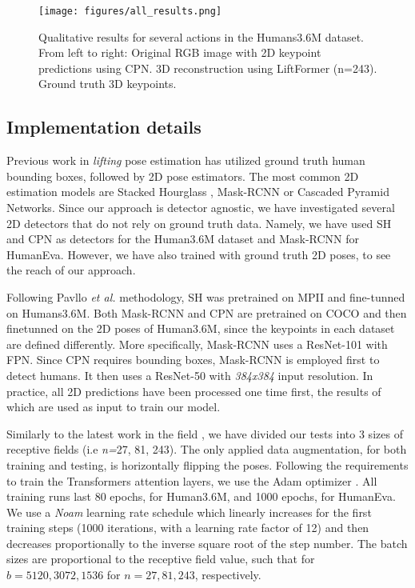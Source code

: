 \documentclass[letterpaper]{article}
\begin{document}
\begin{figure*}[bp]
    \centering
    \texttt{[image: figures/all\_results.png]}
    \caption{Qualitative results for several actions in the Humans3.6M dataset. From left to right: Original RGB image with 2D keypoint predictions using CPN. 3D reconstruction using LiftFormer (n=243). Ground truth 3D keypoints.}
    \label{fig:qualitative_results}
\end{figure*}

\subsection{Implementation details}
Previous work in \textit{lifting} pose estimation has utilized ground truth human bounding boxes, followed by 2D pose estimators. The most common 2D estimation models are Stacked Hourglass \cite{newell16}, Mask-RCNN \cite{he17} or Cascaded Pyramid Networks\cite{chen18}. Since our approach is detector agnostic, we have investigated several 2D detectors that do not rely on ground truth data. Namely, we have used SH and CPN as detectors for the Human3.6M dataset and Mask-RCNN for HumanEva. However, we have also trained with ground truth 2D poses, to see the reach of our approach.

Following Pavllo \textit{et al.} \cite{pavllo19} methodology, SH  was pretrained on MPII and fine-tunned on Humans3.6M. Both Mask-RCNN and CPN are pretrained on COCO \cite{lin14} and then finetunned on the 2D poses of Human3.6M, since the keypoints in each dataset are defined differently. More specifically, Mask-RCNN uses a ResNet-101 with FPN. Since CPN requires bounding boxes, Mask-RCNN is employed first to detect humans. It then uses a ResNet-50 with \textit{384x384} input resolution. In practice, all 2D predictions have been processed one time first, the results of which are used as input to train our model.

Similarly to the latest work in the field \cite{pavllo19, liu20}, we have divided our tests into 3 sizes of receptive fields (i.e \textit{n=}27, 81, 243).  The only applied data augmentation, for both training and testing, is horizontally flipping the poses. Following the requirements to train the Transformers attention layers, we use the Adam optimizer \cite{reddi18}. All training runs last 80 epochs, for Human3.6M, and 1000 epochs, for HumanEva. We use a \textit{Noam} learning rate schedule which linearly increases for the first training steps \cite{goyal17} (1000 iterations, with a learning rate factor of 12) and then decreases proportionally to the inverse square root of the step number. The batch sizes are proportional to the receptive field value, such that for $b=5120, 3072, 1536$ for $n=27, 81, 243$, respectively. 
\end{document}

